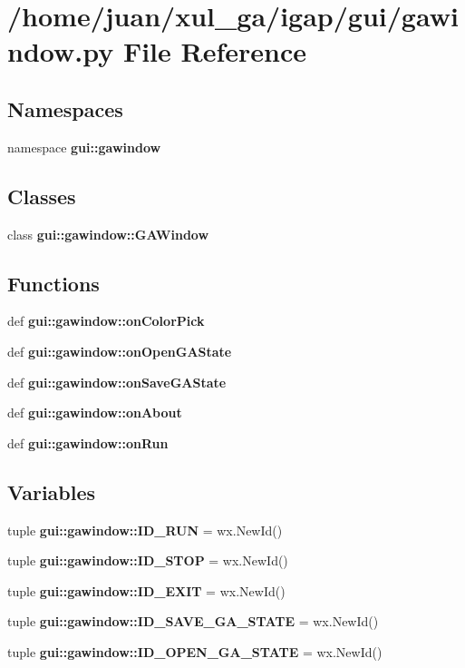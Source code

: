 \section{/home/juan/xul\_\-ga/igap/gui/gawindow.py File Reference}
\label{gawindow_8py}
\subsection*{Namespaces}
\begin{CompactItemize}
\item 
namespace {\bf gui::gawindow}
\end{CompactItemize}
\subsection*{Classes}
\begin{CompactItemize}
\item 
class {\bf gui::gawindow::GAWindow}
\end{CompactItemize}
\subsection*{Functions}
\begin{CompactItemize}
\item 
def {\bf gui::gawindow::onColorPick}
\item 
def {\bf gui::gawindow::onOpenGAState}
\item 
def {\bf gui::gawindow::onSaveGAState}
\item 
def {\bf gui::gawindow::onAbout}
\item 
def {\bf gui::gawindow::onRun}
\end{CompactItemize}
\subsection*{Variables}
\begin{CompactItemize}
\item 
tuple {\bf gui::gawindow::ID\_\-RUN} = wx.NewId()
\item 
tuple {\bf gui::gawindow::ID\_\-STOP} = wx.NewId()
\item 
tuple {\bf gui::gawindow::ID\_\-EXIT} = wx.NewId()
\item 
tuple {\bf gui::gawindow::ID\_\-SAVE\_\-GA\_\-STATE} = wx.NewId()
\item 
tuple {\bf gui::gawindow::ID\_\-OPEN\_\-GA\_\-STATE} = wx.NewId()
\end{CompactItemize}

